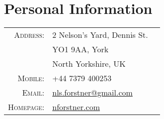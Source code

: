 \documentclass[a4paper,10pt]{article}
\begin{document}
\par{
    \bigskip\par
}


\section{Personal Information}

\begin{tabular}{rll}
    \textsc{Address:}       & 2 Nelson's Yard, Dennis St. \\
                            & YO1 9AA, York \\
                            & North Yorkshire, UK \\
    \textsc{Mobile:}        & +44 7379 400253\\
    \textsc{Email:}         & \href{mailto:nls.forstner@gmail.com}{nls.forstner@gmail.com} \\
    \textsc{Homepage:}      & \href{https:nforstner.com}{nforstner.com} \\
\end{tabular}
\end{document}
